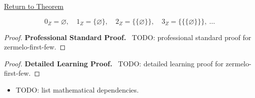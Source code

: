 \newpage
{}
\label{prf:zermelo-first-few}

\begin{remark*}[Return]
\hyperref[prop:zermelo-first-few]{Return to Theorem}
\end{remark*}

\begin{theorem*}
\[
0_Z=\varnothing,\quad
1_Z=\{\varnothing\},\quad
2_Z=\{\{\varnothing\}\},\quad
3_Z=\{\{\{\varnothing\}\}\},\ \dots
\]
\end{theorem*}

\begin{proof}
\textbf{Professional Standard Proof.}~
TODO: professional standard proof for zermelo-first-few.
\end{proof}

\begin{proof}
\textbf{Detailed Learning Proof.}~
TODO: detailed learning proof for zermelo-first-few.
\end{proof}

\begin{remark*}
\end{remark*}

\begin{dependencies}
\begin{itemize}
  \item TODO: list mathematical dependencies.
\end{itemize}
\end{dependencies}

\clearpage
